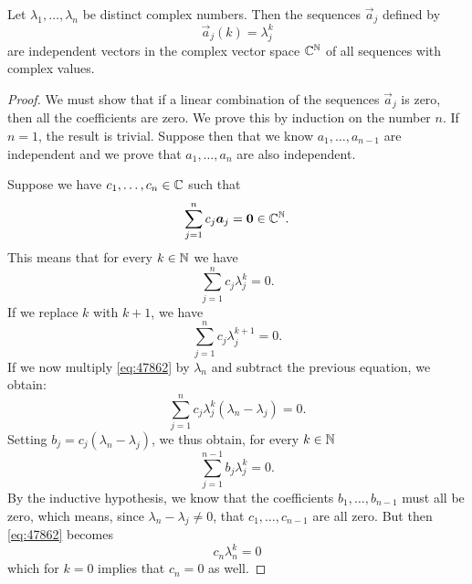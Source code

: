 \begin{theorem}
\label{th:indipendenza_successioni_esponenziali}
Let $\lambda_1, \dots, \lambda_n$ be distinct complex numbers. 
Then the sequences $\vec a_j$ defined by
\[
  \vec a_j (k) = \lambda_j^k
\]
are independent vectors in the complex vector space ${\mathbb C}^{\mathbb N}$ of all
sequences with complex values.
\end{theorem}
%
\begin{proof}
We must show that if a linear combination of the
sequences $\vec a_j$ is zero, then all the coefficients
are zero. 
We prove this by induction on the number $n$. 
If $n=1$, the result is trivial. 
Suppose then that we know $a_1,\dots, a_{n-1}$ are independent 
and we prove that $a_1,\dots, a_n$ are also independent.

Suppose we have $c_1, \dots, c_n\in {\mathbb C}$ such that
\[
  \sum_{j=1}^n c_j \boldsymbol a_j = \boldsymbol 0 \in {\mathbb C}^{\mathbb N}.
\]
This means that for every $k\in {\mathbb N}$ we have
\begin{equation}\label{eq:47862}
  \sum_{j=1}^n c_j \lambda_j^k = 0.
\end{equation}
If we replace $k$ with $k+1$, we have
\[
  \sum_{j=1}^n c_j \lambda_j^{k+1} = 0.
\]
If we now multiply \eqref{eq:47862} by $\lambda_n$ and
subtract the previous equation, we obtain:
\[
  \sum_{j=1}^n c_j \lambda_j^k(\lambda_n - \lambda_j) = 0.   
\]
Setting $b_j = c_j (\lambda_n - \lambda_j)$, we thus obtain,
for every $k\in {\mathbb N}$
\[
 \sum_{j=1}^{n-1}  b_j \lambda_j^k = 0.
\]
By the inductive hypothesis, we know that the coefficients $b_1,\dots, b_{n-1}$ 
must all be zero, which means, 
since $\lambda_n-\lambda_j\neq 0$, that $c_1,\dots, c_{n-1}$ 
are all zero. 
But then \eqref{eq:47862} becomes 
\[
  c_n \lambda_n^k = 0  
\]
which for $k=0$ implies that $c_n=0$ as well.
\end{proof}

